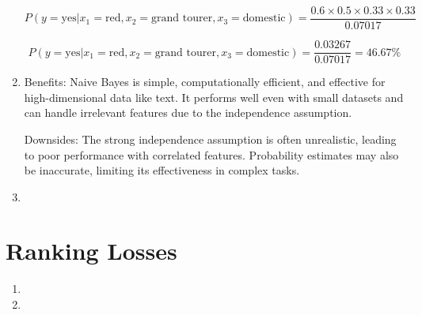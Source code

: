 \documentclass[a4paper]{article}
\begin{document}
\begin{enumerate}
\[
P(y = \text{yes} | x_1 = \text{red}, x_2 = \text{grand tourer}, x_3 = \text{domestic}) = \frac{0.6 \times 0.5 \times 0.33 \times 0.33}{0.07017}
\]

\[
P(y = \text{yes} | x_1 = \text{red}, x_2 = \text{grand tourer}, x_3 = \text{domestic}) = \frac{0.03267}{0.07017} = 46.67\%
\]


    \item 

Benefits: Naive Bayes is simple, computationally efficient, and effective for high-dimensional data like text. It performs well even with small datasets and can handle irrelevant features due to the independence assumption.

Downsides: The strong independence assumption is often unrealistic, leading to poor performance with correlated features. Probability estimates may also be inaccurate, limiting its effectiveness in complex tasks.

    \item 
\end{enumerate}



\section{Ranking Losses}
\begin{enumerate}
    \item 
    \item 
\end{enumerate}
\end{document}
